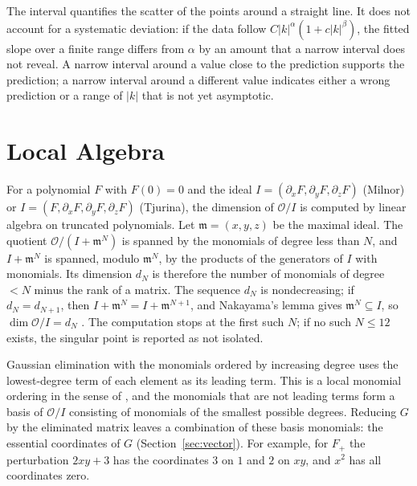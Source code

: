 The interval quantifies the scatter of the points around a straight line. It
does not account for a systematic deviation: if the data follow
$C|k|^\alpha(1+c|k|^\beta)$, the fitted slope over a finite range differs from
$\alpha$ by an amount that a narrow interval does not reveal. A narrow interval
around a value close to the prediction supports the prediction; a narrow
interval around a different value indicates either a wrong prediction or a
range of $|k|$ that is not yet asymptotic.

\section{Local Algebra}
\label{sec:method-algebra}

For a polynomial $F$ with $F(0)=0$ and the ideal
$I=(\partial_xF,\partial_yF,\partial_zF)$ (Milnor) or $I=(F,\partial_xF,\partial_yF,\partial_zF)$
(Tjurina), the dimension of $\mathcal{O}/I$ is computed by linear algebra on
truncated polynomials. Let $\mathfrak m=(x,y,z)$ be the maximal ideal. The
quotient $\mathcal{O}/(I+\mathfrak m^N)$ is spanned by the monomials of degree
less than $N$, and $I+\mathfrak m^N$ is spanned, modulo $\mathfrak m^N$, by the
products of the generators of $I$ with monomials. Its dimension $d_N$ is
therefore the number of monomials of degree $<N$ minus the rank of a matrix.
The sequence $d_N$ is nondecreasing; if $d_N=d_{N+1}$, then
$I+\mathfrak m^N=I+\mathfrak m^{N+1}$, and Nakayama's lemma gives
$\mathfrak m^N\subseteq I$, so $\dim\mathcal{O}/I=d_N$
\cite{greuel2008singular}. The computation stops at the first such $N$; if no
such $N\le12$ exists, the singular point is reported as not isolated.

Gaussian elimination with the monomials ordered by increasing degree uses the
lowest-degree term of each element as its leading term. This is a local
monomial ordering in the sense of \cite{greuel2008singular}, and the monomials
that are not leading terms form a basis of $\mathcal{O}/I$ consisting of
monomials of the smallest possible degrees. Reducing $G$ by the eliminated
matrix leaves a combination of these basis monomials: the essential
coordinates of $G$ (Section~\ref{sec:vector}). For example, for $F_+$ the
perturbation $2xy+3$ has the coordinates $3$ on $1$ and $2$ on $xy$, and
$x^2$ has all coordinates zero.

